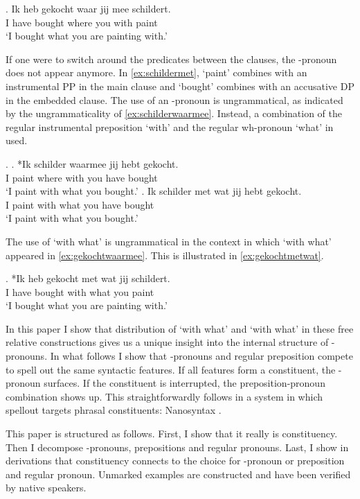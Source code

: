 \documentclass{article}
\begin{document}
\exg. Ik heb gekocht waar jij mee schildert.\\
 I have bought where you with paint\\
 `I bought what you are painting with.'\label{ex:gekochtwaarmee}

If one were to switch around the predicates between the clauses, the -pronoun does not appear anymore. In \ref{ex:schildermet},  `paint' combines with an instrumental PP in the main clause and  `bought' combines with an accusative DP in the embedded clause. The use of an -pronoun is ungrammatical, as indicated by the ungrammaticality of \ref{ex:schilderwaarmee}. Instead, a combination of the regular instrumental preposition  `with' and the regular wh-pronoun  `what' in used.

\ex.\label{ex:schildermet}
\ag. *Ik schilder waarmee jij hebt gekocht.\\
 I paint {where with} you have bought\\
 `I paint with what you bought.'\label{ex:schilderwaarmee}
\bg. Ik schilder met wat jij hebt gekocht.\\
 I paint with what you have bought\\
 `I paint with what you bought.'\label{ex:schildermetwat}

The use of  `with what' is ungrammatical in the context in which  `with what' appeared in \ref{ex:gekochtwaarmee}. This is illustrated in \ref{ex:gekochtmetwat}.

\exg. *Ik heb gekocht met wat jij schildert.\\
 I have bought with what you paint\\
 `I bought what you are painting with.'\label{ex:gekochtmetwat}

In this paper I show that distribution of  `with what' and  `with what' in these free relative constructions gives us a unique insight into the internal structure of -pronouns. In what follows I show that -pronouns and regular preposition compete to spell out the same syntactic features. If all features form a constituent, the -pronoun surfaces. If the constituent is interrupted, the preposition-pronoun combination shows up. This straightforwardly follows in a system in which spellout targets phrasal constituents: Nanosyntax \citep{starke2006}.

This paper is structured as follows. First, I show that it really is constituency. Then I decompose -pronouns, prepositions and regular pronouns. Last, I show in derivations that constituency connects to the choice for -pronoun or preposition and regular pronoun. Unmarked examples are constructed and have been verified by native speakers.
\end{document}
